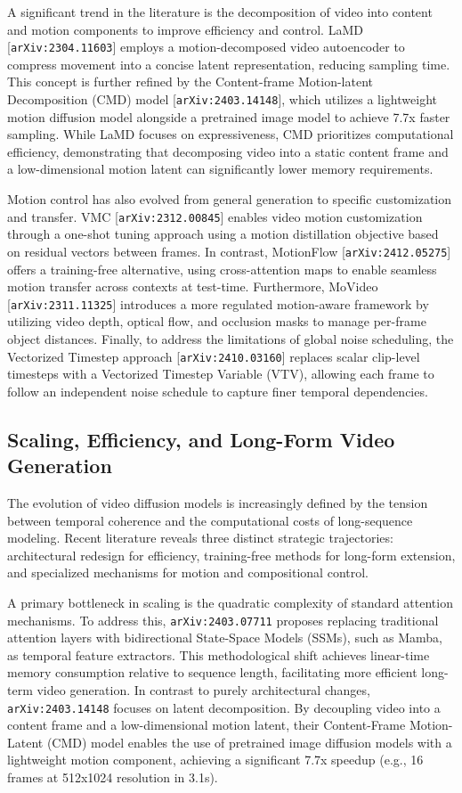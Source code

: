 \documentclass[11pt]{article}
\begin{document}
A significant trend in the literature is the decomposition of video into content and motion components to improve efficiency and control. LaMD [\texttt{arXiv:2304.11603}] employs a motion-decomposed video autoencoder to compress movement into a concise latent representation, reducing sampling time. This concept is further refined by the Content-frame Motion-latent Decomposition (CMD) model [\texttt{arXiv:2403.14148}], which utilizes a lightweight motion diffusion model alongside a pretrained image model to achieve 7.7x faster sampling. While LaMD focuses on expressiveness, CMD prioritizes computational efficiency, demonstrating that decomposing video into a static content frame and a low-dimensional motion latent can significantly lower memory requirements.

Motion control has also evolved from general generation to specific customization and transfer. VMC [\texttt{arXiv:2312.00845}] enables video motion customization through a one-shot tuning approach using a motion distillation objective based on residual vectors between frames. In contrast, MotionFlow [\texttt{arXiv:2412.05275}] offers a training-free alternative, using cross-attention maps to enable seamless motion transfer across contexts at test-time. Furthermore, MoVideo [\texttt{arXiv:2311.11325}] introduces a more regulated motion-aware framework by utilizing video depth, optical flow, and occlusion masks to manage per-frame object distances. Finally, to address the limitations of global noise scheduling, the Vectorized Timestep approach [\texttt{arXiv:2410.03160}] replaces scalar clip-level timesteps with a Vectorized Timestep Variable (VTV), allowing each frame to follow an independent noise schedule to capture finer temporal dependencies.

\subsection{Scaling, Efficiency, and Long-Form Video Generation}

The evolution of video diffusion models is increasingly defined by the tension between temporal coherence and the computational costs of long-sequence modeling. Recent literature reveals three distinct strategic trajectories: architectural redesign for efficiency, training-free methods for long-form extension, and specialized mechanisms for motion and compositional control.

A primary bottleneck in scaling is the quadratic complexity of standard attention mechanisms. To address this, \texttt{arXiv:2403.07711} proposes replacing traditional attention layers with bidirectional State-Space Models (SSMs), such as Mamba, as temporal feature extractors. This methodological shift achieves linear-time memory consumption relative to sequence length, facilitating more efficient long-term video generation. In contrast to purely architectural changes, \texttt{arXiv:2403.14148} focuses on latent decomposition. By decoupling video into a content frame and a low-dimensional motion latent, their Content-Frame Motion-Latent (CMD) model enables the use of pretrained image diffusion models with a lightweight motion component, achieving a significant 7.7x speedup (e.g., 16 frames at 512x1024 resolution in 3.1s).
\end{document}
